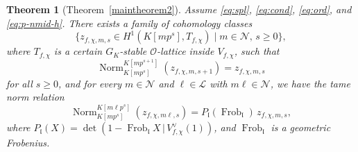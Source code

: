 \documentclass[10pt,letterpaper]{amsart}
\theoremstyle{plain}
\newtheorem{thm}{Theorem}[subsection] %
\theoremstyle{definition}
\theoremstyle{definition}
\theoremstyle{plain}
\theoremstyle{plain}
\theoremstyle{plain}
\theoremstyle{remark}
\numberwithin{equation}{section}
\newcommand{\pp}{\mathfrak{p}}
\newcommand{\ppbar}{\bar{\mathfrak{p}}}
\newcommand{\fkm}{\mathfrak{m}}
\newcommand{\fkl}{\mathfrak{l}}
\DeclareMathOperator{\Norm}{\mathrm{Norm}}
\DeclareMathOperator{\Frob}{\mathrm{Frob}}
\begin{document}
{%
%

\begin{thm}[Theorem~\ref{maintheorem2}]
\label{thmA}%
Assume \eqref{eq:spl}, \eqref{eq:cond}, \eqref{eq:ord}, and \eqref{eq:p-nmid-h}. There exists a family of cohomology classes
\[
\bigl\{z_{f,\chi,m,s}\in H^1(K[mp^s],T_{f,\chi})\;\lvert\; m\in\mathcal{N},\, s\geq 0\bigr\},
\]
where $T_{f,\chi}$ is a certain $G_K$-stable $\mathcal{O}$-lattice inside $V_{f,\chi}$, such that 
\[
\Norm^{K[mp^{s+1}]}_{K[mp^s]}(z_{f,\chi,m,s+1})=z_{f,\chi,m,s}
\]
for all $s\geq 0$, and for every $m\in\mathcal{N}$ and $\ell\in\mathcal{L}$ with $m\ell\in\mathcal{N}$, we have the tame norm relation
\[
\Norm^{K[m\ell p^s]}_{K[mp^s]}(z_{f,\chi,m\ell,s})=
P_{\fkl}(\Frob_{\fkl})\,z_{f,\chi,m,s},
\] 
where $P_{\fkl}(X)=\det(1-\Frob_{\fkl}X\,\vert\,V_{f,\chi}^\vee(1))$, and $\Frob_\fkl$ is a geometric Frobenius.
\end{thm}

}
\end{document}

